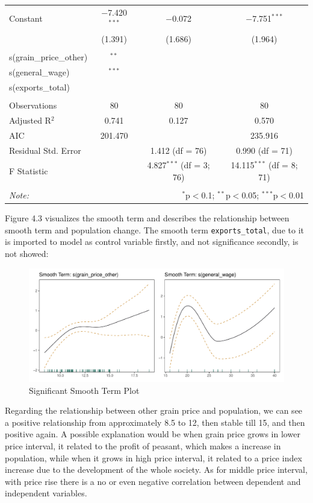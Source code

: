 \begin{table}[h]
\begin{tabular}{@{\extracolsep{5pt}}lccc}
    Constant & $-$7.420$^{***}$ & $-$0.072 & $-$7.751$^{***}$ \\
     & (1.391) & (1.686) & (1.964) \\
    \hline \\[-1.8ex]
    s(grain\_price\_other) & $^{**}$ & & \\
    s(general\_wage) & $^{***}$ & & \\
    s(exports\_total) &  & & \\
    \hline \\[-1.8ex]
    Observations & 80 & 80 & 80 \\
    Adjusted R$^{2}$ & 0.741 & 0.127 & 0.570 \\
    AIC & 201.470 & & 235.916 \\
    Residual Std. Error & & 1.412 (df = 76) & 0.990 (df = 71) \\
    F Statistic & & 4.827$^{***}$ (df = 3; 76) & 14.115$^{***}$ (df = 8; 71) \\
    \hline
    \hline \\[-1.8ex]
    \textit{Note:}  & \multicolumn{3}{r}{$^{*}$p$<$0.1; $^{**}$p$<$0.05; $^{***}$p$<$0.01} \\
    \end{tabular}
\end{table}

Figure 4.3 visualizes the smooth term and describes the relationship between smooth term and population change. The smooth term \texttt{exports\_total}, due to it is imported to model as control variable firstly, and not significance secondly, is not showed:

\begin{figure}[h]
    \centering
    \caption{Significant Smooth Term Plot}
    \includegraphics[width=.95\textwidth]{../03_outputs/smoothterm.pdf}
\end{figure}

Regarding the relationship between other grain price and population, we can see a positive relationship from approximately 8.5 to 12, then stable till 15, and then positive again. A possible explanation would be when grain price grows in lower price interval, it related to the profit of peasant, which makes a increase in population, while when it grows in high price interval, it related to a price index increase due to the development of the whole society. As for middle price interval, with price rise there is a no or even negative correlation between dependent and independent variables.

